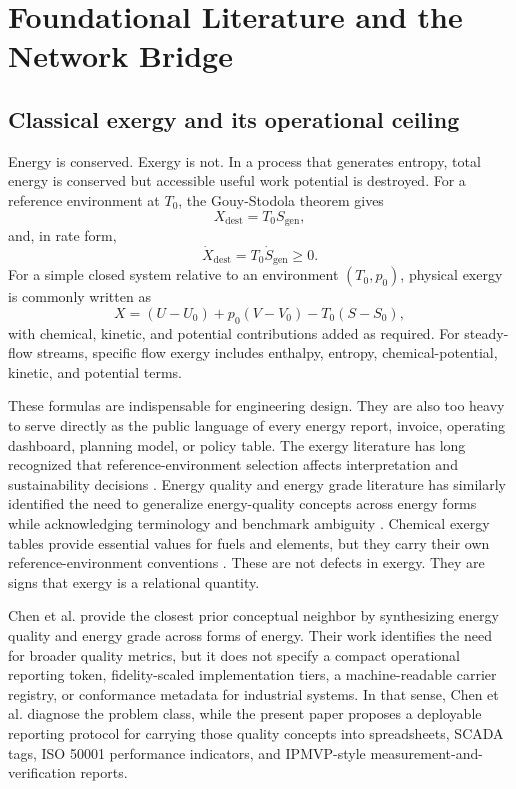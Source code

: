 \documentclass[11pt]{article}
\begin{document}
\section{Foundational Literature and the Network Bridge}

\subsection*{Classical exergy and its operational ceiling}

Energy is conserved. Exergy is not. In a process that generates entropy, total energy is conserved but accessible useful work potential is destroyed. For a reference environment at $T_0$, the Gouy-Stodola theorem gives
\begin{equation}
X_{\mathrm{dest}} = T_0 S_{\mathrm{gen}},
\end{equation}
and, in rate form,
\begin{equation}
\dot{X}_{\mathrm{dest}} = T_0 \dot{S}_{\mathrm{gen}} \ge 0.
\end{equation}
For a simple closed system relative to an environment $(T_0,p_0)$, physical exergy is commonly written as
\begin{equation}
X = (U-U_0)+p_0(V-V_0)-T_0(S-S_0),
\end{equation}
with chemical, kinetic, and potential contributions added as required. For steady-flow streams, specific flow exergy includes enthalpy, entropy, chemical-potential, kinetic, and potential terms.

These formulas are indispensable for engineering design. They are also too heavy to serve directly as the public language of every energy report, invoice, operating dashboard, planning model, or policy table. The exergy literature has long recognized that reference-environment selection affects interpretation and sustainability decisions \cite{gaudreau2012}. Energy quality and energy grade literature has similarly identified the need to generalize energy-quality concepts across energy forms while acknowledging terminology and benchmark ambiguity \cite{chen2022}. Chemical exergy tables provide essential values for fuels and elements, but they carry their own reference-environment conventions \cite{morris1986,rivero2006,szargut2005}. These are not defects in exergy. They are signs that exergy is a relational quantity.

Chen et al. \cite{chen2022} provide the closest prior conceptual neighbor by synthesizing energy quality and energy grade across forms of energy. Their work identifies the need for broader quality metrics, but it does not specify a compact operational reporting token, fidelity-scaled implementation tiers, a machine-readable carrier registry, or conformance metadata for industrial systems. In that sense, Chen et al. diagnose the problem class, while the present paper proposes a deployable reporting protocol for carrying those quality concepts into spreadsheets, SCADA tags, ISO 50001 performance indicators, and IPMVP-style measurement-and-verification reports.
\end{document}

